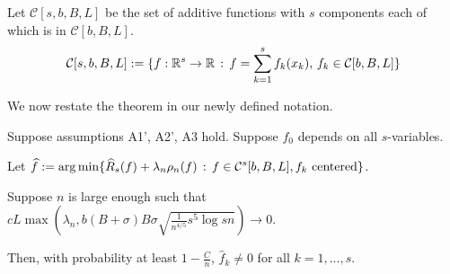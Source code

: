 Let $\mathcal{C}[s,b,B,L]$ be the set of additive functions with $s$ components each of which is in $\mathcal{C}[b,B,L]$. 
\[
\mathcal{C}[s,b,B,L] := \{ f : {\mathbb R}^s \rightarrow {\mathbb R} \,:\, f = \sum_{k=1}^s f_k(x_k), \, f_k \in \mathcal{C}[b,B,L] \}
\]
 

We now restate the theorem in our newly defined notation.
 
\begin{theorem} 
Suppose assumptions A1', A2', A3 hold. Suppose $f_0$ depends on all $s$-variables. 

Let $\displaystyle \widehat{f} := \arg\min \{ \widehat{R}_s(f) + \lambda_n \rho_n(f) \,:\, f \in \mathcal{C}^s[b,B,L], f_k \textrm{ centered} \}$.

Suppose $n$ is large enough such that $c L \max \left(\lambda_n, b (B+\sigma)B\sigma \sqrt{\frac{1}{n^{4/5}} s^5 \log sn} \right) \rightarrow 0$.

Then, with probability at least $1-\frac{C}{n}$, $\hat{f}_k \neq 0$ for all $k =1,...,s$.
\end{theorem}

